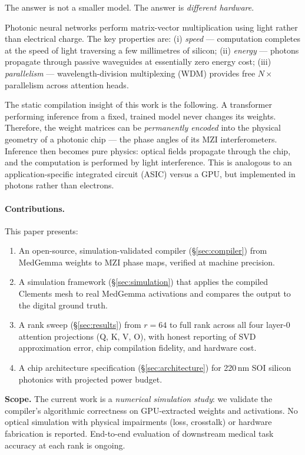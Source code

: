 \documentclass[12pt, a4paper]{article}
\begin{document}
The answer is not a smaller model.
The answer is \emph{different hardware}.

Photonic neural networks perform matrix-vector multiplication using light
rather than electrical charge.
The key properties are:
(i) \emph{speed} --- computation completes at the speed of light traversing a
few millimetres of silicon;
(ii) \emph{energy} --- photons propagate through passive waveguides at
essentially zero energy cost;
(iii) \emph{parallelism} --- wavelength-division multiplexing (WDM) provides
free $N\times$ parallelism across attention heads.

The static compilation insight of this work is the following.
A transformer performing inference from a fixed, trained model never changes
its weights.
Therefore, the weight matrices can be \emph{permanently encoded} into the
physical geometry of a photonic chip --- the phase angles of its MZI
interferometers.
Inference then becomes pure physics: optical fields propagate through the chip,
and the computation is performed by light interference.
This is analogous to an application-specific integrated circuit (ASIC) versus a
GPU, but implemented in photons rather than electrons.

\paragraph{Contributions.} This paper presents:
\begin{enumerate}
  \item An open-source, simulation-validated compiler (\S\ref{sec:compiler})
        from MedGemma weights to MZI phase maps, verified at machine precision.
  \item A simulation framework (\S\ref{sec:simulation}) that applies the
        compiled Clements mesh to real MedGemma activations and compares the
        output to the digital ground truth.
  \item A rank sweep (\S\ref{sec:results}) from $r=64$ to full rank across all
        four layer-0 attention projections (Q, K, V, O), with honest reporting
        of SVD approximation error, chip compilation fidelity, and hardware cost.
  \item A chip architecture specification (\S\ref{sec:architecture}) for
        220\,nm SOI silicon photonics with projected power budget.
\end{enumerate}

\noindent
\textbf{Scope.} The current work is a \emph{numerical simulation study}:
we validate the compiler's algorithmic correctness on GPU-extracted weights and
activations.
No optical simulation with physical impairments (loss, crosstalk) or hardware
fabrication is reported.
End-to-end evaluation of downstream medical task accuracy at each rank is
ongoing.
\end{document}
